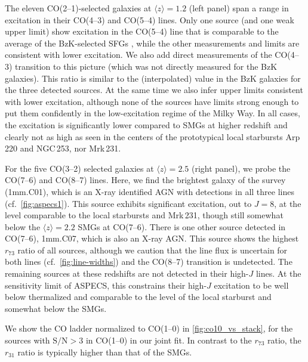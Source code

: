 \documentclass[twocolumn]{aastex62}
\newcommand{\avg}[1]{\ensuremath{\langle #1 \rangle}}
\begin{document}
The eleven CO(2--1)-selected galaxies at $\avg{z}=1.2$ (left panel) span a
range in excitation in their CO(4--3) and CO(5--4) lines.  Only one source (and
one weak upper limit) show excitation in the CO(5--4) line that is comparable
to the average of the BzK-selected SFGs \citep{Daddi2015}, while the other
measurements and limits are consistent with lower excitation.  We also add
direct measurements of the CO(4--3) transition to this picture (which was not
directly measured for the BzK galaxies).  This ratio is similar to the
(interpolated) value in the BzK galaxies for the three detected sources.  At
the same time we also infer upper limits consistent with lower excitation,
although none of the sources have limits strong enough to put them confidently
in the low-excitation regime of the Milky Way.  In all cases, the excitation is
significantly lower compared to SMGs at higher redshift and clearly not as high
as seen in the centers of the prototypical local starbursts Arp\,220 and
NGC\,253, nor Mrk\,231.

For the five CO(3--2) selected galaxies at $\avg{z}=2.5$ (right panel), we
probe the CO(7--6) and CO(8--7) lines.  Here, we find the brightest galaxy of
the survey (1mm.C01), which is an X-ray identified AGN with detections in all
three lines (cf.\ \autoref{fig:aspecs1}).  This source exhibits significant
excitation, out to $J=8$, at the level comparable to the local starbursts and
Mrk\,231, though still somewhat below the $\avg{z}=2.2$ SMGs at CO(7--6).
There is one other source detected in CO(7--6), 1mm.C07, which is also an X-ray
AGN.  This source shows the highest $r_{73}$ ratio of all sources, although we
caution that the line flux is uncertain for both lines (cf.\
\autoref{fig:line-widths}) and the CO(8--7) transition is undetected.  The
remaining sources at these redshifts are not detected in their high-$J$ lines.
At the sensitivity limit of ASPECS, this constrains their high-$J$ excitation
to be well below thermalized and comparable to the level of the local starburst
and somewhat below the \cite{Bothwell2013} SMGs.

We show the CO ladder normalized to CO(1--0) in \autoref{fig:co10_vs_stack},
for the sources with $\mathrm{S/N}>3$ in CO(1--0) in our joint fit.  In
contrast to the $r_{73}$ ratio, the $r_{31}$ ratio is typically higher than
that of the \cite{Bothwell2013} SMGs.
\end{document}
